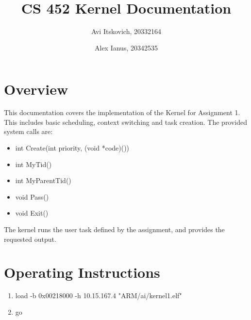 \documentclass{article}
\title{CS 452 Kernel Documentation}
\author{
  Avi Itskovich, 20332164
  \and
  Alex Ianus, 20342535
}
\begin{document}
\maketitle

\section{Overview}

This documentation covers the implementation of the Kernel for Assignment 1. This includes basic scheduling, context switching and task creation. The provided system calls are:
\begin{itemize}
  \item int Create(int priority, (void *code)())
  \item int MyTid()
  \item int MyParentTid()
  \item void Pass()
  \item void Exit()
\end{itemize}
The kernel runs the user task defined by the assignment, and provides the requested output.

\section{Operating Instructions}
\begin{enumerate}
  \item load -b 0x00218000 -h 10.15.167.4 "ARM/ai/kernel1.elf"
  \item go
\end{enumerate}
\end{document}
